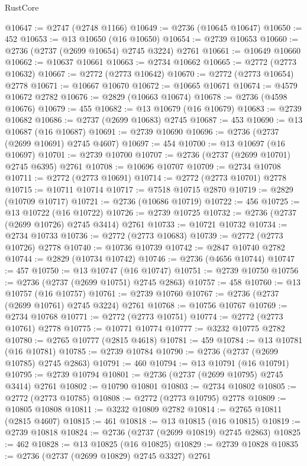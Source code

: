 \begin{lexlean}{RustCore}
\begin{coremodule}
@10647 := @2747 (@2748 @1166)
@10649 := @2736 (@10645 @10647)
@10650 := 452
@10653 := @13 @10650 (@16 @10650)
@10654 := @2739 @10653
@10660 := @2736 (@2737 (@2699 @10654) @2745 @3224) @2761
@10661 := @10649 @10660
@10662 := @10637 @10661
@10663 := @2734 @10662
@10665 := @2772 (@2773 @10632)
@10667 := @2772 (@2773 @10642)
@10670 := @2772 (@2773 @10654) @2778
@10671 := @10667 @10670
@10672 := @10665 @10671
@10674 := @4579 @10672 @2782
@10676 := @2829 (@10663 @10674)
@10678 := @2736 (@4598 @10676)
@10679 := 455
@10682 := @13 @10679 (@16 @10679)
@10683 := @2739 @10682
@10686 := @2737 (@2699 @10683) @2745
@10687 := 453
@10690 := @13 @10687 (@16 @10687)
@10691 := @2739 @10690
@10696 := @2736 (@2737 (@2699 @10691) @2745 @4607)
@10697 := 454
@10700 := @13 @10697 (@16 @10697)
@10701 := @2739 @10700
@10707 := @2736 (@2737 (@2699 @10701) @2745 @6395) @2761
@10708 := @10696 @10707
@10709 := @2734 @10708
@10711 := @2772 (@2773 @10691)
@10714 := @2772 (@2773 @10701) @2778
@10715 := @10711 @10714
@10717 := @7518 @10715 @2870
@10719 := @2829 (@10709 @10717)
@10721 := @2736 (@10686 @10719)
@10722 := 456
@10725 := @13 @10722 (@16 @10722)
@10726 := @2739 @10725
@10732 := @2736 (@2737 (@2699 @10726) @2745 @3414) @2761
@10733 := @10721 @10732
@10734 := @2734 @10733
@10736 := @2772 (@2773 @10683)
@10739 := @2772 (@2773 @10726) @2778
@10740 := @10736 @10739
@10742 := @2847 @10740 @2782
@10744 := @2829 (@10734 @10742)
@10746 := @2736 (@4656 @10744)
@10747 := 457
@10750 := @13 @10747 (@16 @10747)
@10751 := @2739 @10750
@10756 := @2736 (@2737 (@2699 @10751) @2745 @2863)
@10757 := 458
@10760 := @13 @10757 (@16 @10757)
@10761 := @2739 @10760
@10767 := @2736 (@2737 (@2699 @10761) @2745 @3224) @2761
@10768 := @10756 @10767
@10769 := @2734 @10768
@10771 := @2772 (@2773 @10751)
@10774 := @2772 (@2773 @10761) @2778
@10775 := @10771 @10774
@10777 := @3232 @10775 @2782
@10780 := @2765 @10777 (@2815 @4618)
@10781 := 459
@10784 := @13 @10781 (@16 @10781)
@10785 := @2739 @10784
@10790 := @2736 (@2737 (@2699 @10785) @2745 @2863)
@10791 := 460
@10794 := @13 @10791 (@16 @10791)
@10795 := @2739 @10794
@10801 := @2736 (@2737 (@2699 @10795) @2745 @3414) @2761
@10802 := @10790 @10801
@10803 := @2734 @10802
@10805 := @2772 (@2773 @10785)
@10808 := @2772 (@2773 @10795) @2778
@10809 := @10805 @10808
@10811 := @3232 @10809 @2782
@10814 := @2765 @10811 (@2815 @4607)
@10815 := 461
@10818 := @13 @10815 (@16 @10815)
@10819 := @2739 @10818
@10824 := @2736 (@2737 (@2699 @10819) @2745 @2863)
@10825 := 462
@10828 := @13 @10825 (@16 @10825)
@10829 := @2739 @10828
@10835 := @2736 (@2737 (@2699 @10829) @2745 @3327) @2761

\end{coremodule}
\end{lexlean}

